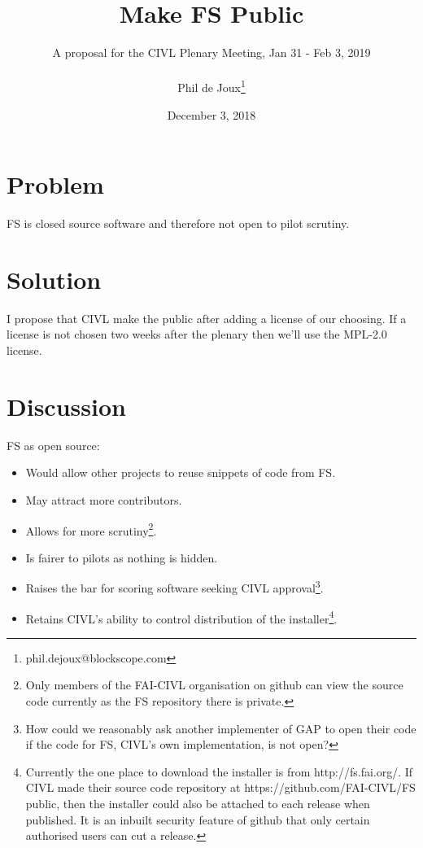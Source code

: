 \documentclass{article}
\title{Make FS Public}
\date{December 3, 2018}
\author{A proposal for the CIVL Plenary Meeting, Jan 31 - Feb 3, 2019\\\\
Phil de Joux\thanks{phil.dejoux@blockscope.com}}
\begin{document}
\maketitle
\section*{Problem}
FS is closed source software and therefore not open to pilot scrutiny.

\section*{Solution}
I propose that CIVL make the  public after adding a license of our choosing. If a license is not
chosen two weeks after the plenary then we'll use the MPL-2.0 license.

\section*{Discussion}
FS as open source:\\
\begin{itemize}
    \item Would allow other projects to reuse snippets of code from FS.
    \item May attract more contributors.
    \item Allows for more scrutiny\footnote{Only members of the FAI-CIVL
    organisation on github can view the source code currently as the FS
    repository there is private.}.
    \item Is fairer to pilots as nothing is hidden.
    \item Raises the bar for scoring software seeking CIVL
    approval\footnote{How could we reasonably ask another implementer of GAP to
    open their code if the code for FS, CIVL's own implementation, is not
    open?}.
    \item Retains CIVL's ability to control distribution of the
    installer\footnote{Currently the one place to download the installer is
    from http://fs.fai.org/. If CIVL made their source code repository at
    https://github.com/FAI-CIVL/FS public, then the installer could also be
    attached to each release when published. It is an inbuilt security feature
    of github that only certain authorised users can cut a release.}.
\end{itemize}
\end{document}
